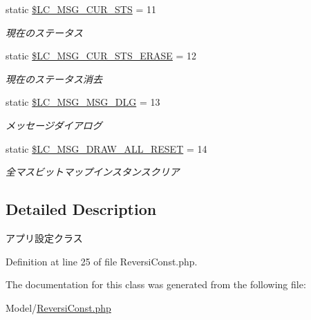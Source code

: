 \begin{DoxyCompactItemize}
\mbox{\label{class_reversi_const_ac3301c4726ee8acb3d5f2810d9e0559e}} 
static \hyperlink{class_reversi_const_ac3301c4726ee8acb3d5f2810d9e0559e}{\$\+L\+C\+\_\+\+M\+S\+G\+\_\+\+C\+U\+R\+\_\+\+S\+TS} = 11
\begin{DoxyCompactList}\small\item\em 現在のステータス \end{DoxyCompactList}\item 
\mbox{\label{class_reversi_const_a820a0338238bbd1f21c29b63aadbf2c8}} 
static \hyperlink{class_reversi_const_a820a0338238bbd1f21c29b63aadbf2c8}{\$\+L\+C\+\_\+\+M\+S\+G\+\_\+\+C\+U\+R\+\_\+\+S\+T\+S\+\_\+\+E\+R\+A\+SE} = 12
\begin{DoxyCompactList}\small\item\em 現在のステータス消去 \end{DoxyCompactList}\item 
\mbox{\label{class_reversi_const_a11bb64ddfba78520e7864e0fe8aa89d1}} 
static \hyperlink{class_reversi_const_a11bb64ddfba78520e7864e0fe8aa89d1}{\$\+L\+C\+\_\+\+M\+S\+G\+\_\+\+M\+S\+G\+\_\+\+D\+LG} = 13
\begin{DoxyCompactList}\small\item\em メッセージダイアログ \end{DoxyCompactList}\item 
\mbox{\label{class_reversi_const_ab474e9969881fca250d354949405d7d8}} 
static \hyperlink{class_reversi_const_ab474e9969881fca250d354949405d7d8}{\$\+L\+C\+\_\+\+M\+S\+G\+\_\+\+D\+R\+A\+W\+\_\+\+A\+L\+L\+\_\+\+R\+E\+S\+ET} = 14
\begin{DoxyCompactList}\small\item\em 全マスビットマップインスタンスクリア \end{DoxyCompactList}\end{DoxyCompactItemize}


\subsection{Detailed Description}
アプリ設定クラス 

Definition at line 25 of file Reversi\+Const.\+php.



The documentation for this class was generated from the following file\+:\begin{DoxyCompactItemize}
\item 
Model/\hyperlink{_reversi_const_8php}{Reversi\+Const.\+php}\end{DoxyCompactItemize}
